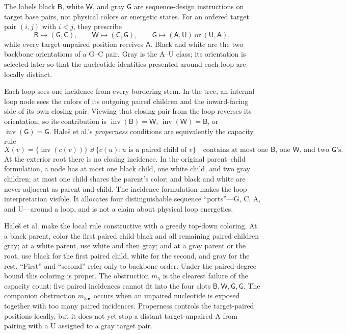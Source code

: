 \documentclass[11pt]{article}
\newcommand{\A}{\textsf{A}}
\newcommand{\C}{\textsf{C}}
\newcommand{\G}{\textsf{G}}
\newcommand{\U}{\textsf{U}}
\newcommand{\Bcol}{\mathsf{B}}
\newcommand{\Wcol}{\mathsf{W}}
\newcommand{\Gray}{\mathsf{G}}
\newcommand{\inv}{\operatorname{inv}}
\begin{document}
The labels black $\Bcol$, white $\Wcol$, and gray $\Gray$ are sequence-design instructions on target base pairs, not physical colors or energetic states.  For an ordered target pair $(i,j)$ with $i<j$, they prescribe
\[
\Bcol\longmapsto(\G,\C),\qquad
\Wcol\longmapsto(\C,\G),\qquad
\Gray\longmapsto(\A,\U)\ \text{or}\ (\U,\A),
\]
while every target-unpaired position receives $\A$.  Black and white are the two backbone orientations of a G--C pair.  Gray is the A--U class; its orientation is selected later so that the nucleotide identities presented around each loop are locally distinct.

Each loop sees one incidence from every bordering stem.  In the tree, an internal loop node sees the colors of its outgoing paired children and the inward-facing side of its own closing pair.  Viewing that closing pair from the loop reverses its orientation, so its contribution is $\inv(\Bcol)=\Wcol$, $\inv(\Wcol)=\Bcol$, or $\inv(\Gray)=\Gray$.  Hale\v{s} et al.'s \emph{properness} conditions are equivalently the capacity rule
\[
X(v)=\{\inv(c(v))\}\uplus\{c(u):u\text{ is a paired child of }v\}
\quad\text{contains at most one $\Bcol$, one $\Wcol$, and two $\Gray$'s.}
\]
At the exterior root there is no closing incidence.  In the original parent--child formulation, a node has at most one black child, one white child, and two gray children; at most one child shares the parent's color; and black and white are never adjacent as parent and child.  The incidence formulation makes the loop interpretation visible.  It allocates four distinguishable sequence ``ports''---G, C, A, and U---around a loop, and is not a claim about physical loop energetics.

Hale\v{s} et al. make the local rule constructive with a greedy top-down coloring.  At a black parent, color the first paired child black and all remaining paired children gray; at a white parent, use white and then gray; and at a gray parent or the root, use black for the first paired child, white for the second, and gray for the rest.  ``First'' and ``second'' refer only to backbone order.  Under the paired-degree bound this coloring is proper.  The obstruction $m_5$ is the clearest failure of the capacity count: five paired incidences cannot fit into the four slots $\Bcol,\Wcol,\Gray,\Gray$.  The companion obstruction $m_{3\bullet}$ occurs when an unpaired nucleotide is exposed together with too many paired incidences.  Properness controls the target-paired positions locally, but it does not yet stop a distant target-unpaired A from pairing with a U assigned to a gray target pair.
\end{document}
